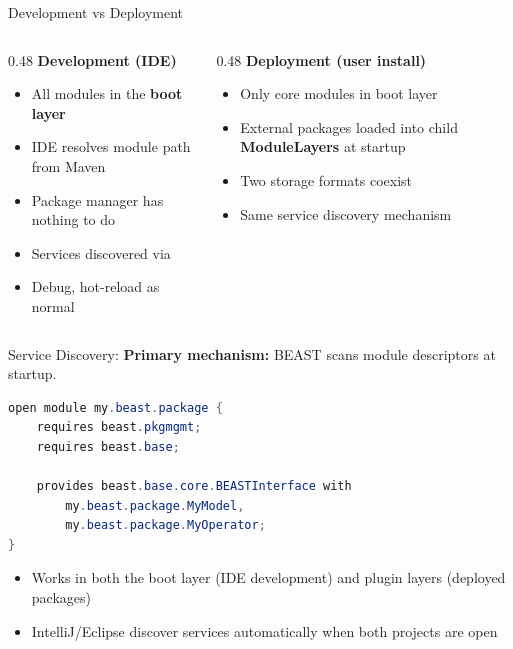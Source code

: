 \begin{frame}{Development vs Deployment}
\begin{columns}[T]
\begin{column}{0.48\textwidth}
\textbf{Development (IDE)}
\begin{itemize}
\item All modules in the \textbf{boot layer}
\item IDE resolves module path from Maven
\item Package manager has nothing to do
\item Services discovered via 
\item Debug, hot-reload as normal
\end{itemize}
\end{column}
\begin{column}{0.48\textwidth}
\textbf{Deployment (user install)}
\begin{itemize}
\item Only core modules in boot layer
\item External packages loaded into child \textbf{ModuleLayers} at startup
\item Two storage formats coexist
\item Same service discovery mechanism
\end{itemize}
\end{column}
\end{columns}
\end{frame}

\begin{frame}[fragile]{Service Discovery: }
\textbf{Primary mechanism:} BEAST scans module descriptors at startup.

\begin{lstlisting}[language=Java]
open module my.beast.package {
    requires beast.pkgmgmt;
    requires beast.base;

    provides beast.base.core.BEASTInterface with
        my.beast.package.MyModel,
        my.beast.package.MyOperator;
}
\end{lstlisting}

\begin{itemize}
\item Works in both the boot layer (IDE development) and plugin layers (deployed packages)
\item IntelliJ/Eclipse discover services automatically when both projects are open
\end{itemize}
\end{frame}

